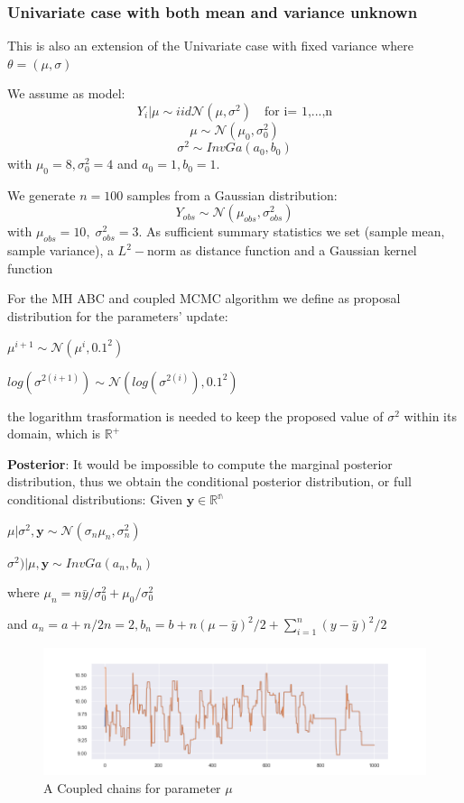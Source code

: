 \documentclass {article}
\begin{document}
\subsubsection{Univariate case with both mean and variance unknown}

This is also an extension of the Univariate case with fixed variance where $\theta = (\mu,\sigma)$

We assume as model:
$$ Y_i | \mu \sim{iid} \mathcal{N}(\mu, \sigma ^2) \quad \text{for i= 1,...,n} $$
$$ \mu  \sim \mathcal{N}(\mu_0, \sigma_0^2)$$
$$ \sigma^2 \sim InvGa(a_0,b_0)
$$
with $\mu_0=8, \sigma_0^2=4$ and $a_0=1, b_0=1$.

We generate $n= 100$ samples from a Gaussian distribution:
$$
Y_{obs} \sim \mathcal{N}(\mu_{obs}, \sigma_{obs} ^2)
$$
with
$
\mu_{obs} = 10, \;
\sigma_{obs} ^2 = 3
$.
As sufficient summary statistics we set (sample mean, sample variance), a $L^2-$norm as distance function and a Gaussian kernel function

	
For the MH ABC and coupled MCMC algorithm we define as proposal distribution for the parameters' update:
\begin{center}
	$ \mu^{i+1} \sim	\mathcal{N}( \mu^{i}, 0.1^2) $
	
	$ log(\sigma^{2(i+1)}) \sim \mathcal{N}( log(\sigma^{2(i)}), 0.1^2) $
\end{center}
the logarithm trasformation is needed to keep the proposed value of $ \sigma^2$ within its domain, 
which is $\mathbb{R^{+}}$

	
\textbf{Posterior}:
It would be impossible to compute the marginal posterior distribution, thus we obtain the conditional posterior distribution, or full conditional distributions:
Given $\mathbf{y} \in \mathbb{R^{n}} $
\begin{center}
	
	$ \mu| \sigma^2,\mathbf{y} \sim	\mathcal{N}( \sigma_n\mu_n, \sigma_n^2) $
	
	$ \sigma^{2})| \mu,\mathbf{y} \sim InvGa( a_n,b_n) $
	
	where $ \mu_n= n\bar y/\sigma_0^2 + \mu_0/\sigma_0^2$
\end{center}		
and $a_n= a + n/2n=2, b_n=b + n(\mu-\bar y)^2/2 +	\sum_{i=1}^n (y-\bar y)^2/2 $









\begin{figure}[h!]
	\centering
	\includegraphics[width=\textwidth]{doublecoupling_pack/doublecoupling_mu_chain_meeting}
	\caption{A Coupled chains for parameter $\mu$ }   %
	\label{muchainsdouble}
\end{figure}
\end{document}
